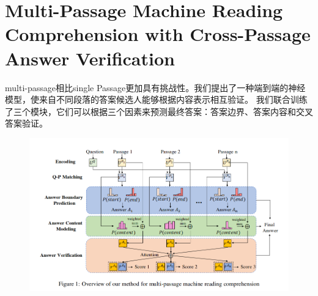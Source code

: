 \documentclass[a4paper,UTF8]{article}
\numberwithin{equation}{section}
\begin{document}
\section{Multi-Passage Machine Reading Comprehension with Cross-Passage Answer Verification}
multi-passage相比single Passage更加具有挑战性。我们提出了一种端到端的神经模型，使来自不同段落的答案候选人能够根据内容表示相互验证。
我们联合训练了三个模块，它们可以根据三个因素来预测最终答案：答案边界、答案内容和交叉答案验证。
\begin{figure}[H]
	\centering
	\includegraphics[width=\textwidth]{13-1.png}
\end{figure}
\end{document}
